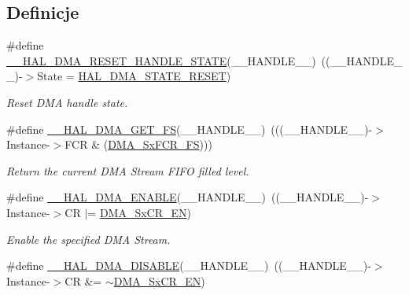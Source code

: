 \subsection*{Definicje}
\begin{DoxyCompactItemize}
\item 
\#define \hyperlink{group___d_m_a_gaadcee34f0999c8eafd37de2f69daa0ac}{\+\_\+\+\_\+\+H\+A\+L\+\_\+\+D\+M\+A\+\_\+\+R\+E\+S\+E\+T\+\_\+\+H\+A\+N\+D\+L\+E\+\_\+\+S\+T\+A\+TE}(\+\_\+\+\_\+\+H\+A\+N\+D\+L\+E\+\_\+\+\_\+)~((\+\_\+\+\_\+\+H\+A\+N\+D\+L\+E\+\_\+\+\_\+)-\/$>$State = \hyperlink{group___d_m_a___exported___types_gga9c012af359987a240826f29073bbe463a9e7be73da32b8c837cde0318e0d5eed2}{H\+A\+L\+\_\+\+D\+M\+A\+\_\+\+S\+T\+A\+T\+E\+\_\+\+R\+E\+S\+ET})
\begin{DoxyCompactList}\small\item\em Reset D\+MA handle state. \end{DoxyCompactList}\item 
\#define \hyperlink{group___d_m_a_ga8f0ff408d25904040b9d23ee7f6af080}{\+\_\+\+\_\+\+H\+A\+L\+\_\+\+D\+M\+A\+\_\+\+G\+E\+T\+\_\+\+FS}(\+\_\+\+\_\+\+H\+A\+N\+D\+L\+E\+\_\+\+\_\+)~(((\+\_\+\+\_\+\+H\+A\+N\+D\+L\+E\+\_\+\+\_\+)-\/$>$Instance-\/$>$F\+CR \& (\hyperlink{group___peripheral___registers___bits___definition_ga56094479dc9b173b00ccfb199d8a2853}{D\+M\+A\+\_\+\+Sx\+F\+C\+R\+\_\+\+FS})))
\begin{DoxyCompactList}\small\item\em Return the current D\+MA Stream F\+I\+FO filled level. \end{DoxyCompactList}\item 
\#define \hyperlink{group___d_m_a_ga93900b3ef3f87ef924eb887279a434b4}{\+\_\+\+\_\+\+H\+A\+L\+\_\+\+D\+M\+A\+\_\+\+E\+N\+A\+B\+LE}(\+\_\+\+\_\+\+H\+A\+N\+D\+L\+E\+\_\+\+\_\+)~((\+\_\+\+\_\+\+H\+A\+N\+D\+L\+E\+\_\+\+\_\+)-\/$>$Instance-\/$>$CR $\vert$=  \hyperlink{group___peripheral___registers___bits___definition_gaabf69fe92e9a44167535365b0fe4ea9e}{D\+M\+A\+\_\+\+Sx\+C\+R\+\_\+\+EN})
\begin{DoxyCompactList}\small\item\em Enable the specified D\+MA Stream. \end{DoxyCompactList}\item 
\#define \hyperlink{group___d_m_a_gafeef4c5e8c3f015cdecc0f37bbe063dc}{\+\_\+\+\_\+\+H\+A\+L\+\_\+\+D\+M\+A\+\_\+\+D\+I\+S\+A\+B\+LE}(\+\_\+\+\_\+\+H\+A\+N\+D\+L\+E\+\_\+\+\_\+)~((\+\_\+\+\_\+\+H\+A\+N\+D\+L\+E\+\_\+\+\_\+)-\/$>$Instance-\/$>$CR \&=  $\sim$\hyperlink{group___peripheral___registers___bits___definition_gaabf69fe92e9a44167535365b0fe4ea9e}{D\+M\+A\+\_\+\+Sx\+C\+R\+\_\+\+EN})

\end{DoxyCompactItemize}

